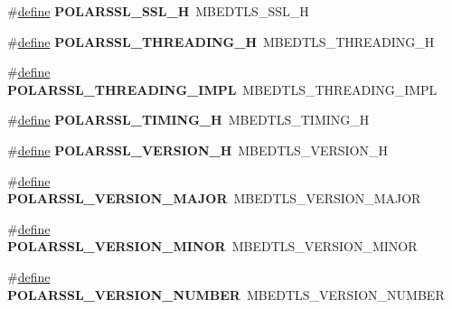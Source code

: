 \begin{DoxyCompactItemize}
\#\hyperlink{structdefine}{define} {\bfseries P\+O\+L\+A\+R\+S\+S\+L\+\_\+\+S\+S\+L\+\_\+H}~M\+B\+E\+D\+T\+L\+S\+\_\+\+S\+S\+L\+\_\+H
\item 
\mbox{\label{compat-1_83_8h_a31661790c7e4dc4fff08b1001a817fea}} 
\#\hyperlink{structdefine}{define} {\bfseries P\+O\+L\+A\+R\+S\+S\+L\+\_\+\+T\+H\+R\+E\+A\+D\+I\+N\+G\+\_\+H}~M\+B\+E\+D\+T\+L\+S\+\_\+\+T\+H\+R\+E\+A\+D\+I\+N\+G\+\_\+H
\item 
\mbox{\label{compat-1_83_8h_a2e5803bec081641bfa4c004de62dd360}} 
\#\hyperlink{structdefine}{define} {\bfseries P\+O\+L\+A\+R\+S\+S\+L\+\_\+\+T\+H\+R\+E\+A\+D\+I\+N\+G\+\_\+\+I\+M\+PL}~M\+B\+E\+D\+T\+L\+S\+\_\+\+T\+H\+R\+E\+A\+D\+I\+N\+G\+\_\+\+I\+M\+PL
\item 
\mbox{\label{compat-1_83_8h_af017d7fc811ccd4862998f4e813a68d5}} 
\#\hyperlink{structdefine}{define} {\bfseries P\+O\+L\+A\+R\+S\+S\+L\+\_\+\+T\+I\+M\+I\+N\+G\+\_\+H}~M\+B\+E\+D\+T\+L\+S\+\_\+\+T\+I\+M\+I\+N\+G\+\_\+H
\item 
\mbox{\label{compat-1_83_8h_ac0977c263ee06e39ab81bcf77e3a425f}} 
\#\hyperlink{structdefine}{define} {\bfseries P\+O\+L\+A\+R\+S\+S\+L\+\_\+\+V\+E\+R\+S\+I\+O\+N\+\_\+H}~M\+B\+E\+D\+T\+L\+S\+\_\+\+V\+E\+R\+S\+I\+O\+N\+\_\+H
\item 
\mbox{\label{compat-1_83_8h_a7b2767c47fe157b1fe766ca30cf37bbc}} 
\#\hyperlink{structdefine}{define} {\bfseries P\+O\+L\+A\+R\+S\+S\+L\+\_\+\+V\+E\+R\+S\+I\+O\+N\+\_\+\+M\+A\+J\+OR}~M\+B\+E\+D\+T\+L\+S\+\_\+\+V\+E\+R\+S\+I\+O\+N\+\_\+\+M\+A\+J\+OR
\item 
\mbox{\label{compat-1_83_8h_a6b6e1f4fcc43a274d44c4eb176ce35ba}} 
\#\hyperlink{structdefine}{define} {\bfseries P\+O\+L\+A\+R\+S\+S\+L\+\_\+\+V\+E\+R\+S\+I\+O\+N\+\_\+\+M\+I\+N\+OR}~M\+B\+E\+D\+T\+L\+S\+\_\+\+V\+E\+R\+S\+I\+O\+N\+\_\+\+M\+I\+N\+OR
\item 
\mbox{\label{compat-1_83_8h_a8a3f68a90790a378a533add3660ef1f2}} 
\#\hyperlink{structdefine}{define} {\bfseries P\+O\+L\+A\+R\+S\+S\+L\+\_\+\+V\+E\+R\+S\+I\+O\+N\+\_\+\+N\+U\+M\+B\+ER}~M\+B\+E\+D\+T\+L\+S\+\_\+\+V\+E\+R\+S\+I\+O\+N\+\_\+\+N\+U\+M\+B\+ER
\item 

\end{DoxyCompactItemize}
